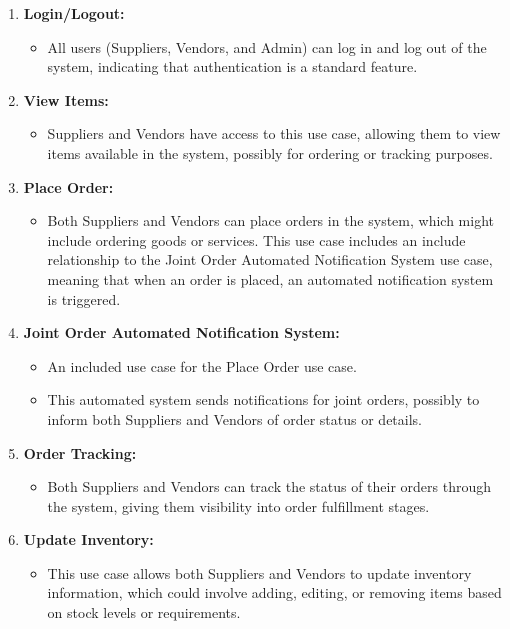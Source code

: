 \begin{enumerate}
    \item \textbf{Login/Logout:}
    \begin{itemize}
        \item All users (Suppliers, Vendors, and Admin) can log in and log out of the system, indicating that authentication is a standard feature.
    \end{itemize}

    \item \textbf{View Items:}
    \begin{itemize}
        \item Suppliers and Vendors have access to this use case, allowing them to view items available in the system, possibly for ordering or tracking purposes.
    \end{itemize}

    \item \textbf{Place Order:}
    \begin{itemize}
        \item Both Suppliers and Vendors can place orders in the system, which might include ordering goods or services. This use case includes an include relationship to the Joint Order Automated Notification System use case, meaning that when an order is placed, an automated notification system is triggered.
    \end{itemize}

    \item \textbf{Joint Order Automated Notification System:}
    \begin{itemize}
        \item An included use case for the Place Order use case.
        \item This automated system sends notifications for joint orders, possibly to inform both Suppliers and Vendors of order status or details.
    \end{itemize}

    \item \textbf{Order Tracking:}
    \begin{itemize}
        \item Both Suppliers and Vendors can track the status of their orders through the system, giving them visibility into order fulfillment stages.
    \end{itemize}

    \item \textbf{Update Inventory:}
    \begin{itemize}
        \item This use case allows both Suppliers and Vendors to update inventory information, which could involve adding, editing, or removing items based on stock levels or requirements.
    \end{itemize}


\end{enumerate}
